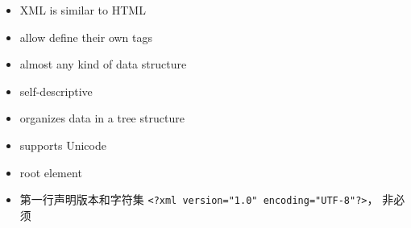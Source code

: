 
\begin{issues}
\issueDraft
\end{issues}

\begin{itemize}
\item XML is similar to HTML
\item allow define their own tags
\item almost any kind of data structure
\item self-descriptive
\item organizes data in a tree structure
\item supports Unicode
\item root element
\item 第一行声明版本和字符集 \verb|<?xml version="1.0" encoding="UTF-8"?>|， 非必须
\end{itemize}
